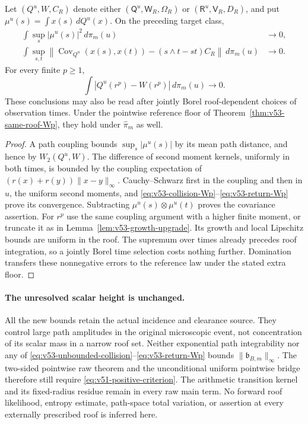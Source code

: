 \begin{corollary}
\label{cor:v53-conditional-moments}
Let $(Q^u,W,C_R)$ denote either
$(\mathsf Q^u,\mathsf W_R,\Omega_R)$ or
$(\mathsf R^u,\mathsf V_R,D_R)$, and put
$\mu^u(s)=\int x(s)\,dQ^u(x)$. On the preceding target class,
\begin{align*}
 \int\sup_s|\mu^u(s)|^2\,d\pi_m(u)&\to0,\\
 \int\sup_{s,t}\left\|
   \operatorname{Cov}_{Q^u}(x(s),x(t))-(s\wedge t-st)C_R
                         \right\|\,d\pi_m(u)&\to0.
\end{align*}
For every finite $p\ge1$,
\[
 \int\left|Q^u(r^p)-W(r^p)\right|\,d\pi_m(u)\to0.
\]
These conclusions may also be read after jointly Borel roof-dependent
choices of observation times. Under the pointwise reference floor
of Theorem~\ref{thm:v53-same-roof-Wp}, they hold under
$\widehat\pi_m$ as well.
\end{corollary}
\begin{proof}
A path coupling bounds $\sup_s|\mu^u(s)|$ by its mean path distance,
and hence by $W_2(Q^u,W)$. The difference of second moment kernels,
uniformly in both times, is bounded by the coupling expectation of
$(r(x)+r(y))\|x-y\|_\infty$. Cauchy--Schwarz first in the coupling
and then in $u$, the uniform second moments, and
\eqref{eq:v53-collision-Wp}--\eqref{eq:v53-return-Wp} prove its
convergence. Subtracting $\mu^u(s)\otimes\mu^u(t)$ proves the
covariance assertion. For $r^p$ use the same coupling argument with
a higher finite moment, or truncate it as in
Lemma~\ref{lem:v53-growth-upgrade}. Its growth and local Lipschitz
bounds are uniform in the roof. The supremum over times already
precedes roof integration, so a jointly Borel time selection costs
nothing further. Domination transfers these nonnegative errors to
the reference law under the stated extra floor.
\end{proof}

\paragraph{The unresolved scalar height is unchanged.}
All the new bounds retain the actual incidence and clearance source.
They control large path amplitudes in the original microscopic event,
not concentration of its scalar mass in a narrow roof set.
Neither exponential path integrability nor any of
\eqref{eq:v53-unbounded-collision}--\eqref{eq:v53-return-Wp} bounds
$\|\mathfrak b_{B,m}\|_\infty$. The two-sided pointwise raw theorem
and the unconditional uniform pointwise bridge therefore still require
\eqref{eq:v51-positive-criterion}. The arithmetic transition kernel
and its fixed-radius residue remain in every raw main term. No
forward roof likelihood, entropy estimate, path-space total variation,
or assertion at every externally prescribed roof is inferred here.
